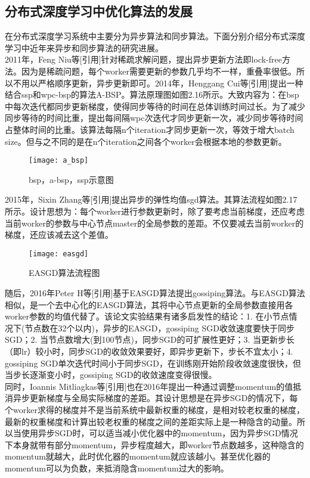 \subsection{分布式深度学习中优化算法的发展}
在分布式深度学习系统中主要分为异步算法和同步算法。下面分别介绍分布式深度学习中近年来异步和同步算法的研究进展。\\
2011年，Feng Niu等[引用]针对稀疏求解问题，提出异步更新方法即lock-free方法。因为是稀疏问题，每个worker需要更新的参数几乎均不一样，重叠率很低。所以不用以严格顺序更新，异步更新即可。2014年，Henggang Cui等[引用]提出一种结合ssp和wpc-bsp的算法A-BSP。算法原理图如图2.16所示。大致内容为：在bsp中每次迭代都同步更新梯度，使得同步等待的时间在总体训练时间过长。为了减少同步等待的时间比重，提出每间隔wpc次迭代才同步更新一次，减少同步等待时间占整体时间的比重。该算法每隔n个iteration才同步更新一次，等效于增大batch size。但与之不同的是在n个iteration之间各个worker会根据本地的参数更新。\\
\begin{figure}[htp]
\centering
\texttt{[image: a\_bsp]}
\caption{bsp，a-bsp，ssp示意图}
\end{figure}
2015年，Sixin Zhang等[引用]提出异步的弹性均值sgd算法。其算法流程如图2.17所示。设计思想为：每个worker进行参数更新时，除了要考虑当前梯度，还应考虑当前worker的参数与中心节点master的全局参数的差距。不仅要减去当前worker的梯度，还应该减去这个差值。
\begin{figure}[htp]
\centering
\texttt{[image: easgd]}
\caption{EASGD算法流程图}
\end{figure}
随后，2016年Peter H等[引用]基于EASGD算法提出gossiping算法。与EASGD算法相似，是一个去中心化的EASGD算法，其将中心节点更新的全局参数直接用各worker参数的均值代替了。该论文实验结果有诸多启发性的结论：1. 在小节点情况下(节点数在32个以内)，异步的EASGD，gossiping SGD收敛速度要快于同步SGD；2. 当节点数增大(到100节点)，同步SGD的可扩展性更好；3. 当更新步长（即lr）较小时，同步SGD的收敛效果要好，即异步更新下，步长不宜太小；4. gossiping SGD单次迭代时间小于同步SGD，在训练刚开始阶段收敛速度很快，但当步长逐渐变小时，gossiping SGD的收敛速度变得很慢。\\
同时，Ioannis Mitliagkas等[引用]也在2016年提出一种通过调整momentum的值抵消异步更新梯度与全局实际梯度的差距。其设计思想是在异步SGD的情况下，每个worker求得的梯度并不是当前系统中最新权重的梯度，是相对较老权重的梯度，最新的权重梯度和计算出较老权重的梯度之间的差距实际上是一种隐含的动量。所以当使用异步SGD时，可以适当减小优化器中的momentum，因为异步SGD情况下本身就带有部分momentum，异步程度越大，即worker节点数越多，这种隐含的momentum就越大，此时优化器的momentum就应该越小。甚至优化器的momentum可以为负数，来抵消隐含momentum过大的影响。\\
